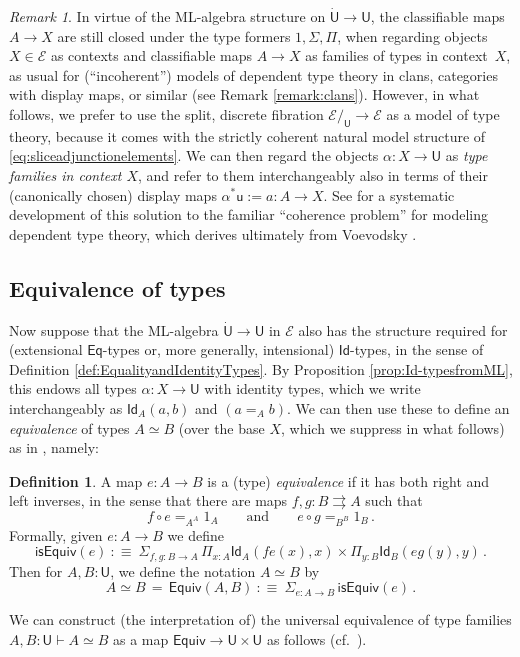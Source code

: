 \documentclass[12pt,reqno]{amsart}
\newcommand{\EE}{\ensuremath{\mathcal{E}}}
\renewcommand{\to}{\ensuremath{\rightarrow}}
\newcommand{\tto}{\ensuremath{\rightrightarrows}}
\newcommand{\Id}{\mathsf{Id}}
\renewcommand{\t}{\ensuremath{\mathsf{u}}}
\newcommand{\T}{\ensuremath{\mathsf{U}}}
\newcommand{\TT}{\ensuremath{\dot{\mathsf{U}}}}
\theoremstyle{remark}
\newtheorem{remark}[theorem]{Remark}
\theoremstyle{definition}
\newtheorem{definition}[theorem]{Definition}
\begin{document}
\begin{remark}\label{remark:classifyingmaps}
In virtue of the ML-algebra structure on $\TT\to\T$, the classifiable maps $A\to X$ are still closed under the type formers $1, \Sigma, \Pi$, when  regarding objects $X \in \EE$ as contexts and classifiable maps $A\to X$ as families of types in context~$X$, as usual for (``incoherent'') models of dependent type theory in clans, categories with display maps, or similar (see Remark \ref{remark:clans}).  However, in what follows, we prefer to use the split, discrete fibration $\EE/_\T \to \EE$ as a model of type theory, because it comes with the strictly coherent natural model structure of \eqref{eq:sliceadjunctionelements}.  We can then regard the objects $\alpha : X \to \T$ as \emph{type families in context $X$}, and refer to them interchangeably also in terms of their (canonically chosen) display maps $\alpha^*\t := a : A \to X$.  See \cite[\S 1--3]{AGH} for a systematic development of this solution to the familiar ``coherence problem'' \cite{Hofmann:1994} for modeling dependent type theory, which derives ultimately from Voevodsky \cite{KL:VV}.  
\end{remark}

\subsection{Equivalence of types}\label{sec:equivalence}

Now suppose that the ML-algebra $\TT \to \T$ in $\EE$ also has the structure required for (extensional $\mathsf{Eq}$-types or, more generally, intensional) $\Id{}$-types, in the sense of Definition \ref{def:EqualityandIdentityTypes}.  By Proposition \ref{prop:Id-typesfromML}, this endows all types $\alpha : X \to \T$ with identity types, which we write interchangeably as $\Id_{A}(a, b)$ and $(a =_A b)$.   We can then use these to define an \emph{equivalence} of types $A\simeq B$ (over the base $X$, which we suppress in what follows) as in \cite[\S 4.3]{HoTTbook}, namely:
%
\begin{definition}
 A map $e : A\to B$ is a (type) \emph{equivalence} if it has both right and left inverses, in the sense that there are maps $f, g : B\tto A$ such that 
 \[
f\circ e =_{A^A} 1_A \qquad\text{and}\qquad  e\circ g =_{B^B} 1_B  \,.
 \]
 Formally, given $e : A\to B$ we define 
 \[
 \mathsf{isEquiv}(e)\ :\equiv\ \Sigma_{f, g: B\to A}\,  \Pi_{x:A}\Id_{A}(fe(x) , x) \times \Pi_{y:B}\Id_{B}(eg(y), y) \,.
 \]
Then for $A, B: \T$, we define the notation $A \simeq B$ by
 \[
A \simeq B\, =\, \mathsf{Equiv}(A,B)\ :\equiv\  \Sigma_{e : A\to B}\, \mathsf{isEquiv}(e)\,.
 \]
\end{definition}
We can construct (the interpretation of) the universal equivalence of type families $A, B : \T \vdash A \simeq B$ as a map $\mathsf{Equiv} \to \T \times \T$ as follows (cf.\ \cite{KL:VV}).
\end{document}

